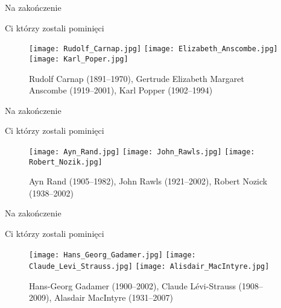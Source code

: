 \documentclass{beamer}  %
\begin{document}
\begin{frame}{Na zakończenie}

  \begin{block}{Ci którzy zostali pominięci}
    \begin{figure}
      \centering

      \texttt{[image: Rudolf\_Carnap.jpg]}
      \texttt{[image: Elizabeth\_Anscombe.jpg]}
      \texttt{[image: Karl\_Poper.jpg]}

      \caption{Rudolf Carnap (1891--1970), Gertrude Elizabeth Margaret
        Anscombe (1919--2001), Karl Popper (1902--1994)}
    \end{figure}
  \end{block}

\end{frame}



\begin{frame}{Na zakończenie}

  \begin{block}{Ci którzy zostali pominięci}
    \begin{figure}
      \centering

      \texttt{[image: Ayn\_Rand.jpg]}
      \texttt{[image: John\_Rawls.jpg]}
      \texttt{[image: Robert\_Nozik.jpg]}
      \caption{Ayn Rand (1905--1982), John Rawls (1921--2002), Robert
        Nozick (1938--2002)}
    \end{figure}
  \end{block}

\end{frame}



\begin{frame}{Na zakończenie}

  \begin{block}{Ci którzy zostali pominięci}
    \begin{figure}
      \centering

      \texttt{[image: Hans\_Georg\_Gadamer.jpg]}
      \texttt{[image: Claude\_Levi\_Strauss.jpg]}
      \texttt{[image: Alisdair\_MacIntyre.jpg]}
      
      \caption{Hans-Georg Gadamer (1900--2002), Claude Lévi-Strauss
        (1908--2009), Alasdair MacIntyre (1931--2007)}
    \end{figure}
  \end{block}

\end{frame}
\end{document}
